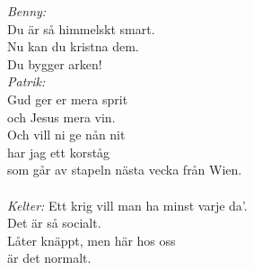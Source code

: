 \documentclass[a6paper, 10pt, twoside]{article}
\begin{document}
\begin{lyrics}
\textit{Benny:}\\
Du är så himmelskt smart.\\
Nu kan du kristna dem.\\
Du bygger arken!\\
\textit{Patrik:}\\
Gud ger er mera sprit\\
och Jesus mera vin.\\
Och vill ni ge nån nit\\
har jag ett korståg \\
som går av stapeln nästa vecka från Wien. \\
\\
\textit{Kelter:}
Ett krig vill man ha minst varje da’. \\
Det är så socialt.\\
Låter knäppt, men här hos oss\\
är det normalt.

\end{lyrics}

\end{document}
